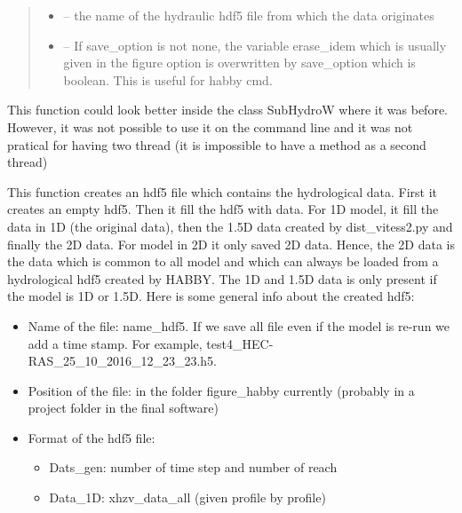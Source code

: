 \documentclass[letterpaper,10pt,english]{sphinxmanual}
\begin{document}
\begin{fulllineitems}
\begin{quote}
\begin{description}
\begin{itemize}
\item {} 
 -- the name of the hydraulic hdf5 file from which the data originates

\item {} 
 -- If save\_option is not none, the variable erase\_idem which is usually given in the figure option
is overwritten by save\_option which is boolean. This is useful for habby cmd.

\end{itemize}

\end{description}\end{quote}


This function could look better inside the class SubHydroW where it was before. However, it was not possible
to use it on the command line and it was not pratical for having two thread (it is impossible to have a method
as a second thread)

This function creates an hdf5 file which contains the hydrological data. First it creates an empty hdf5.
Then it fill the hdf5 with data. For 1D model, it fill the data in 1D (the original data), then the 1.5D data
created by dist\_vitess2.py and finally the 2D data. For model in 2D it only saved 2D data. Hence, the 2D data
is the data which is common to all model and which can always be loaded from a hydrological hdf5 created by
HABBY. The 1D and 1.5D data is only present if the model is 1D or 1.5D. Here is some general info about the
created hdf5:
\begin{itemize}
\item {} 
Name of the file: name\_hdf5. If we save all file even if the model is re-run we add a time stamp.
For example, test4\_HEC-RAS\_25\_10\_2016\_12\_23\_23.h5.

\item {} 
Position of the file: in the folder  figure\_habby currently (probably in a project folder in the final software)

\item {} 
Format of the hdf5 file:
\begin{itemize}
\item {} 
Dats\_gen:  number of time step and number of reach

\item {} 
Data\_1D:  xhzv\_data\_all (given profile by profile)


\end{itemize}
\end{itemize}
\end{fulllineitems}
\end{document}
